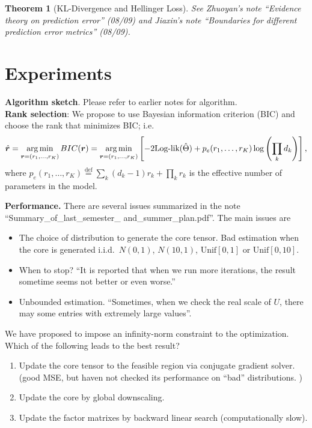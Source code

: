 \documentclass[11pt]{article}
\theoremstyle{plain}
\newtheorem{thm}{Theorem}
\theoremstyle{definition}
\begin{document}
\begin{thm}[KL-Divergence and Hellinger Loss]
See Zhuoyan's note ``Evidence theory on prediction error'' (08/09) and Jiaxin's note ``Boundaries for different prediction error metrics'' (08/09). 
\end{thm}

\section{Experiments}
{\bf Algorithm sketch}. Please refer to earlier notes for algorithm. \\
{\bf Rank selection}: We propose to use Bayesian information criterion (BIC) and choose the rank that minimizes BIC; i.e.
\[
\hat {\bm{r}}=\operatorname*{arg\,min}_{\bm{r}=(r_1,\ldots,r_K)} BIC(\bm{r})=\operatorname*{arg\,min}_{\bm{r}=(r_1,\ldots,r_K)}\left[-2\text{Log-lik}(\hat \Theta)+p_e(r_1,\ldots,r_K)\log \left(\prod_k d_k\right) \right],
\]
where $p_e(r_1,\ldots,r_K)\stackrel{\text{def}}{=}\sum_k (d_k-1)r_k+\prod_k r_k$ is the effective number of parameters in the model. 

{\bf Performance.} There are several issues summarized in the note ``Summary\_of\_last\_semester\_
and\_summer\_plan.pdf''. The main issues are
\begin{itemize}
\item The choice of distribution to generate the core tensor. Bad estimation when the core is generated i.i.d.\ $N(0,1)$, $N(10,1)$, $\text{Unif}[0,1]$ or $\text{Unif}[0,10]$.
\item When to stop? ``It is reported that when we run more iterations, the result sometime seems not better or even worse.''
\item Unbounded estimation. ``Sometimes, when we check the real scale of $U$, there may some entries with extremely large values''.
\end{itemize}
We have proposed to impose an infinity-norm constraint to the optimization. Which of the following leads to the best result?
\begin{enumerate}
\item Update the core tensor to the feasible region via conjugate gradient solver. (good MSE, but haven not checked its performance on ``bad'' distributions. )
\item Update the core by global downscaling.
\item Update the factor matrixes by backward linear search (computationally slow).
\end{enumerate}
\end{document}
